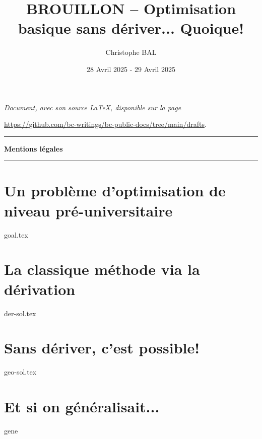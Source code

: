 \documentclass[12pt]{amsart}
\begin{document}
\title{BROUILLON -- Optimisation basique sans dériver... Quoique!}
\author{Christophe BAL}
\date{28 Avril 2025 - 29 Avril 2025}

\maketitle

\begin{center}
	\itshape
	Document, avec son source \LaTeX, disponible sur la page

	\url{https://github.com/bc-writings/bc-public-docs/tree/main/drafts}.
\end{center}


\bigskip


\begin{center}
	\hrule\vspace{.3em}
	{
		\fontsize{1.35em}{1em}\selectfont
		\textbf{Mentions \og légales \fg}
	}

	\vspace{0.45em}
	\doclicenseThis
	\hrule
\end{center}


\bigskip


\setcounter{tocdepth}{2}
\tableofcontents




\newpage





\section{Un problème d'optimisation de niveau pré-universitaire}

{goal.tex}





\section{La classique méthode via la dérivation}

{der-sol.tex}




\section{Sans dériver, c'est possible!}

{geo-sol.tex}




\section{Et si on généralisait...}

{gene}
	
\end{document}

